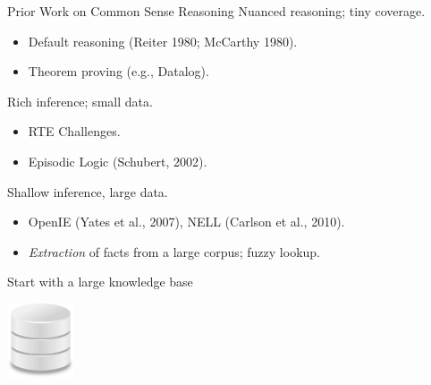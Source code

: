 \begin{frame}{Prior Work on Common Sense Reasoning}
 Nuanced reasoning; tiny coverage.
\begin{itemize}
  \item Default reasoning (Reiter 1980; McCarthy 1980).
  \item Theorem proving (e.g., Datalog).
\end{itemize}
\vspace{0.5cm}
\pause

 Rich inference; small data.
\begin{itemize}
  \item RTE Challenges.
  \item Episodic Logic (Schubert, 2002).
\end{itemize}
\vspace{0.5cm}
\pause

 Shallow inference, large data.
\begin{itemize}
  \item OpenIE (Yates et al., 2007), NELL (Carlson et al., 2010).
  \item \textit{Extraction} of facts from a large corpus; fuzzy lookup.
\end{itemize}
\end{frame}


\begin{frame}{Start with a large knowledge base}
\begin{center}
  \hspace{0.8cm}
  \includegraphics[height=2.2cm]{../../img/database.png}
\end{center}
\end{frame}

